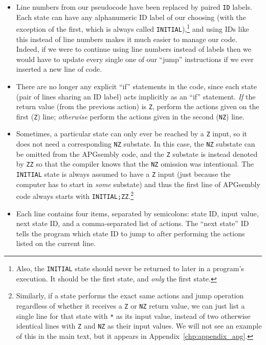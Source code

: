 \begin{itemize}
	\item Line numbers from our pseudocode have been replaced by paired \texttt{ID} labels. Each state can have any alphanumeric ID label of our choosing (with the exception of the first, which is always called \texttt{INITIAL}),\footnote{Also, the \texttt{INITIAL} state should never be returned to later in a program's execution. It should be the first state, and \emph{only} the first state.} and using IDs like this instead of line numbers makes it much easier to manage our code. Indeed, if we were to continue using line numbers instead of labels then we would have to update every single one of our ``jump'' instructions if we ever inserted a new line of code.\smallskip
	
	\item There are no longer any explicit ``if'' statements in the code, since each state (pair of lines sharing an ID label) acts implicitly as an ``if'' statement. \emph{If} the return value (from the previous action) is \texttt{Z}, perform the actions given on the first (\texttt{Z}) line; \emph{otherwise} perform the actions given in the second (\texttt{NZ}) line.\smallskip
	
	\item Sometimes, a particular state can only ever be reached by a \texttt{Z} input, so it does not need a corresponding \texttt{NZ} substate. In this case, the \texttt{NZ} substate can be omitted from the APGsembly code, and the \texttt{Z} substate is instead denoted by \texttt{ZZ} so that the compiler knows that the \texttt{NZ} omission was intentional. The \texttt{INITIAL} state is always assumed to have a \texttt{Z} input (just because the computer has to start in \emph{some} substate) and thus the first line of APGsembly code always starts with \texttt{INITIAL;ZZ}.\footnote{Similarly, if a state performs the exact same actions and jump operation regardless of whether it receives a \texttt{Z} or \texttt{NZ} return value, we can just list a single line for that state with \texttt{*} as its input value, instead of two otherwise identical lines with \texttt{Z} and \texttt{NZ} as their input values. We will not see an example of this in the main text, but it appears in Appendix~\ref{chp:appendix_apg}.}\smallskip
	
	\item Each line contains four items, separated by semicolons: state ID, input value, next state ID, and a comma-separated list of actions. The ``next state'' ID tells the program which state ID to jump to after performing the actions listed on the current line.\smallskip
	

\end{itemize}
